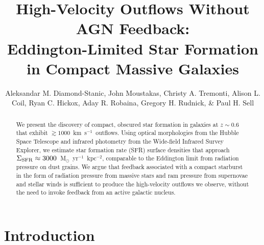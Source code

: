 \documentclass[12pt,preprint]{aastex}
\newcommand{\kms}{km~s$^{-1}$}
\newcommand{\units}{M$_{\odot}$~yr$^{-1}$~kpc$^{-2}$}
\newcommand{\sigmasfr}{\Sigma_{\textnormal{\scriptsize{SFR}}}}
\begin{document}
\title{High-Velocity Outflows Without AGN Feedback:
  \\ Eddington-Limited Star Formation in Compact Massive Galaxies}

\author{Aleksandar M. Diamond-Stanic, John
  Moustakas, Christy A. Tremonti,
  Alison L. Coil, Ryan C. Hickox, Aday
  R. Robaina, Gregory H. Rudnick, \&
  Paul H. Sell }




\begin{abstract}

We present the discovery of compact, obscured star formation in
galaxies at $z\sim0.6$ that exhibit $\gtrsim1000$~\kms\ outflows.
Using optical morphologies from the Hubble Space Telescope and
infrared photometry from the Wide-field Infrared Survey Explorer, we
estimate star formation rate (SFR) surface densities that approach
$\sigmasfr\approx3000$~\units, comparable to the Eddington limit from
radiation pressure on dust grains.  We argue that feedback associated
with a compact starburst in the form of radiation pressure from
massive stars and ram pressure from supernovae and stellar winds is
sufficient to produce the high-velocity outflows we observe, without
the need to invoke feedback from an active galactic nucleus.

\end{abstract}


\section{Introduction}
\end{document}
